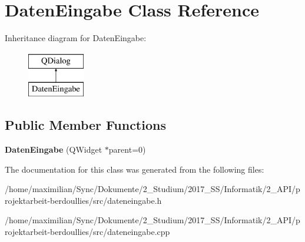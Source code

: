 \hypertarget{class_daten_eingabe}{}\section{Daten\+Eingabe Class Reference}
\label{class_daten_eingabe}
Inheritance diagram for Daten\+Eingabe\+:\begin{figure}[H]
\begin{center}
\leavevmode
\includegraphics[height=2.000000cm]{class_daten_eingabe}
\end{center}
\end{figure}
\subsection*{Public Member Functions}
\begin{DoxyCompactItemize}
\item 
\mbox{\label{class_daten_eingabe_af44ce7d33fc9e87a6fe59d3b5f6db0ed}} 
{\bfseries Daten\+Eingabe} (Q\+Widget $\ast$parent=0)
\end{DoxyCompactItemize}


The documentation for this class was generated from the following files\+:\begin{DoxyCompactItemize}
\item 
/home/maximilian/\+Sync/\+Dokumente/2\+\_\+\+Studium/2017\+\_\+\+S\+S/\+Informatik/2\+\_\+\+A\+P\+I/projektarbeit-\/berdoullies/src/dateneingabe.\+h\item 
/home/maximilian/\+Sync/\+Dokumente/2\+\_\+\+Studium/2017\+\_\+\+S\+S/\+Informatik/2\+\_\+\+A\+P\+I/projektarbeit-\/berdoullies/src/dateneingabe.\+cpp\end{DoxyCompactItemize}
